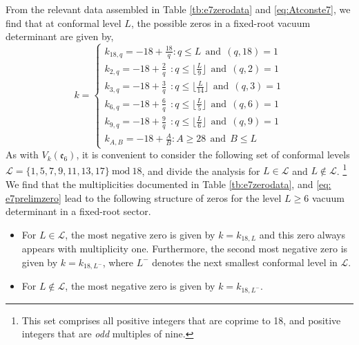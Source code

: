 From the relevant data assembled in Table \ref{tb:e7zerodata} and \eqref{eq:Atconste7}, we find that at conformal level $L$, the possible zeros in a fixed-root vacuum determinant are given by,
\begin{equation} \label{eq: e7prelimzero}
    k = \begin{cases}
        k_{18,q} = -18 + \frac{18}{q}: q \leqslant L \ \ \text{and} \ \ (q,18)=1 \\ 
        k_{2,q} = -18 + \frac{2}{q} \ \ : q \leqslant \lfloor \frac{L}{9} \rfloor \ \ \text{and} \ \ (q,2)=1 \\
        k_{3,q} = -18 + \frac{3}{q} \ \ : q \leqslant \lfloor \frac{L}{14} \rfloor \ \ \text{and} \ \ (q,3)=1 \\
        k_{6,q} = -18 + \frac{6}{q} \ \ : q \leqslant \lfloor \frac{L}{5} \rfloor \ \ \text{and} \ \ (q,6)=1 \\
        k_{9,q} = -18 + \frac{9}{q} \ \ : q \leqslant \lfloor \frac{L}{6} \rfloor \ \ \text{and} \ \ (q,9)=1 \\
        k_{A,B} = -18 + \frac{A}{B}: A \geqslant 28 \ \ \text{and} \ \ B \leqslant L
    \end{cases}
\end{equation}
As with $V_k(\mathfrak{e}_6)$, it is convenient to consider the following set of conformal levels $\mathcal{L} = \{1,5,7,9,11,13,17\}~\text{mod}~18$, and divide the analysis for $L \in \mathcal{L}$ and $L \notin \mathcal{L}$. \footnote{This set comprises all positive integers that are coprime to 18, and positive integers that are \emph{odd} multiples of nine.}  We find that the multiplicities documented in Table \ref{tb:e7zerodata}, and \eqref{eq: e7prelimzero} lead to the following structure of zeros for the level $L \geqslant 6$ vacuum determinant in a fixed-root sector.
\begin{itemize}
    \item For $L \in \mathcal{L}$, the most negative zero is given by $k = k_{18,L}$ and this zero always appears with multiplicity one. Furthermore, the second most negative zero is given by $k = k_{18,L^-}$, where $L^-$ denotes the next smallest conformal level in $\mathcal{L}$. 
    \item For $L \notin \mathcal{L}$, the most negative zero is given by $k = k_{18, L^-}$.
\end{itemize}

